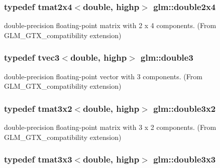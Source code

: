 \subsubsection[{double2x4}]{\setlength{\rightskip}{0pt plus 5cm}typedef tmat2x4$<$double, highp$>$ {\bf glm\+::double2x4}}\label{group__gtx__compatibility_gadb90656f5faac0e800718a0a19bf0e03}


double-\/precision floating-\/point matrix with 2 x 4 components. (From G\+L\+M\+\_\+\+G\+T\+X\+\_\+compatibility extension) 

\hypertarget{group__gtx__compatibility_ga80c4961ce61e918f21c1546d43aea2f0}{}
\subsubsection[{double3}]{\setlength{\rightskip}{0pt plus 5cm}typedef tvec3$<$double, highp$>$ {\bf glm\+::double3}}\label{group__gtx__compatibility_ga80c4961ce61e918f21c1546d43aea2f0}


double-\/precision floating-\/point vector with 3 components. (From G\+L\+M\+\_\+\+G\+T\+X\+\_\+compatibility extension) 

\hypertarget{group__gtx__compatibility_ga00e4b55452fdffa224a68ead4edffa5a}{}
\subsubsection[{double3x2}]{\setlength{\rightskip}{0pt plus 5cm}typedef tmat3x2$<$double, highp$>$ {\bf glm\+::double3x2}}\label{group__gtx__compatibility_ga00e4b55452fdffa224a68ead4edffa5a}


double-\/precision floating-\/point matrix with 3 x 2 components. (From G\+L\+M\+\_\+\+G\+T\+X\+\_\+compatibility extension) 

\hypertarget{group__gtx__compatibility_ga3bcec888e1dca957b39c2213b740ff21}{}
\subsubsection[{double3x3}]{\setlength{\rightskip}{0pt plus 5cm}typedef tmat3x3$<$double, highp$>$ {\bf glm\+::double3x3}}\label{group__gtx__compatibility_ga3bcec888e1dca957b39c2213b740ff21}


